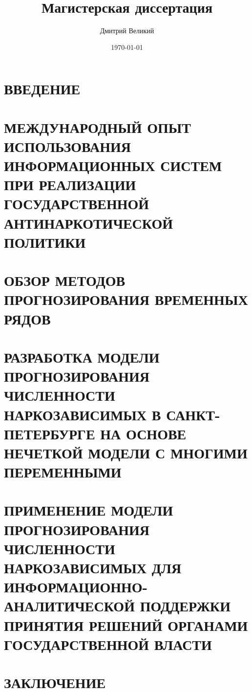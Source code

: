 \documentclass[a4paper,14pt]{report}
\author{Дмитрий Великий}
\title{Магистерская диссертация}
\date{\today}
\begin{document}
\tableofcontents
\chapter*{ВВЕДЕНИЕ}

\chapter{МЕЖДУНАРОДНЫЙ ОПЫТ ИСПОЛЬЗОВАНИЯ ИНФОРМАЦИОННЫХ СИСТЕМ ПРИ РЕАЛИЗАЦИИ
    ГОСУДАРСТВЕННОЙ АНТИНАРКОТИЧЕСКОЙ ПОЛИТИКИ}

\chapter{ОБЗОР МЕТОДОВ ПРОГНОЗИРОВАНИЯ ВРЕМЕННЫХ РЯДОВ}

\chapter{РАЗРАБОТКА МОДЕЛИ ПРОГНОЗИРОВАНИЯ ЧИСЛЕННОСТИ НАРКОЗАВИСИМЫХ В 
САНКТ-ПЕТЕРБУРГЕ НА ОСНОВЕ НЕЧЕТКОЙ МОДЕЛИ С МНОГИМИ ПЕРЕМЕННЫМИ}

\chapter{ПРИМЕНЕНИЕ МОДЕЛИ ПРОГНОЗИРОВАНИЯ ЧИСЛЕННОСТИ НАРКОЗАВИСИМЫХ ДЛЯ
    ИНФОРМАЦИОННО-АНАЛИТИЧЕСКОЙ ПОДДЕРЖКИ ПРИНЯТИЯ РЕШЕНИЙ ОРГАНАМИ
    ГОСУДАРСТВЕННОЙ ВЛАСТИ}

\chapter*{ЗАКЛЮЧЕНИЕ}

\newpage
\printbibliography[title={БИБЛИОГРАФИЧЕСКИЙ СПИСОК},heading=bibintoc]
\end{document}
